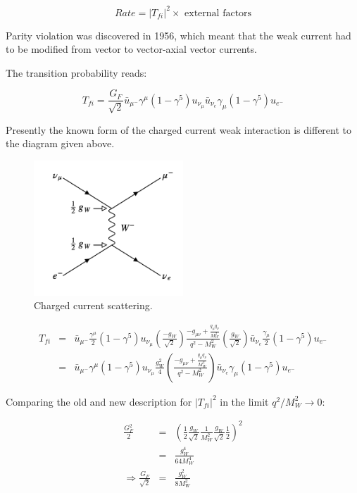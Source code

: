 \[
  Rate = |T_{fi}|^2 \times \textrm{ external factors}
\]

Parity violation was discovered in 1956, which meant that the weak current had to be modified from vector to vector-axial vector currents.

The transition probability reads:

\[
  T_{fi} = \frac{G_F}{\sqrt{2}}\bar{u}_{\mu^-}\gamma^{\mu}(1 - \gamma^5)u_{\nu_{\mu}}\bar{u}_{\nu_e}\gamma_{\mu}(1 - \gamma^5)u_{e^-}
\]

Presently the known form of the charged current weak interaction is different to the diagram given above.

\begin{figure}[!htb]
  \begin{center}
    \includegraphics[width=0.5\textwidth]{images/web_feynman/image_43.png}
    \caption[Charged current scattering]{Charged current scattering.}
    \label{fig:ch12_chargedCurrentScattering}
  \end{center}
\end{figure}

\begin{eqnarray*}
  T_{fi} & = & \bar{u}_{\mu^-}\frac{\gamma^{\mu}}{2}(1 - \gamma^5)u_{\nu_{\mu}}\left(\frac{-g_W}{\sqrt{2}}\right)\frac{-g_{\mu\nu} + \frac{q_{\mu}q_{\nu}}{M_W^2}}{q^2 - M_W^2}\left(\frac{g_W}{\sqrt{2}}\right)\bar{u}_{\nu_e}\frac{\gamma_{\mu}}{2}(1 - \gamma^5)u_{e^-} \\
  & = & \bar{u}_{\mu^-}\gamma^{\mu}(1 - \gamma^5)u_{\nu_{\mu}}\frac{g_W^2}{4}\left(\frac{-g_{\mu\nu} + \frac{q_{\mu}q_{\nu}}{M_W^2}}{q^2 - M_W^2}\right)\bar{u}_{\nu_e}\gamma_{\mu}(1 - \gamma^5)u_{e^-}
\end{eqnarray*}

Comparing the old and new description for $|T_{fi}|^2$ in the limit $q^2/M_W^2 \to 0$:

\begin{eqnarray*}
  \frac{G_F^2}{2} & = & \left(\frac{1}{2}\frac{g_W}{\sqrt{2}}\frac{1}{M_W^2}\frac{g_W}{\sqrt{2}}\frac{1}{2}\right)^2 \\
  & = & \frac{g_W^4}{64M_W^4} \\
  \Rightarrow \frac{G_F}{\sqrt{2}} & = & \frac{g_W^2}{8M_W^2}
\end{eqnarray*}

